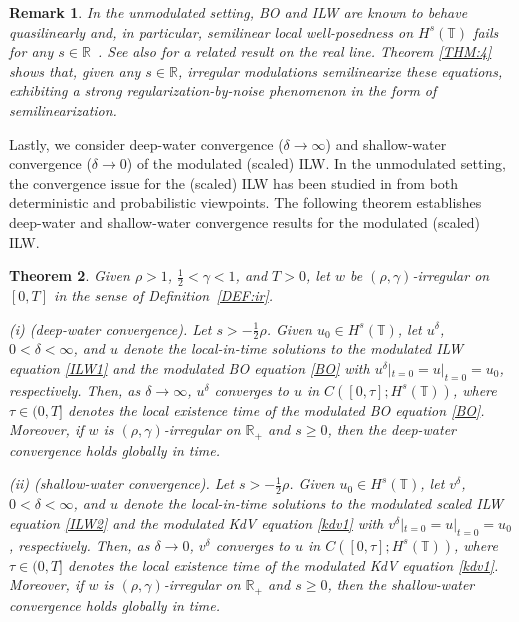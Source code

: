 \documentclass[letterpaper, 11pt,  reqno]{amsart}
\newtheorem{theorem}{Theorem} [section]
\newtheorem{remark}[theorem]{Remark}
\newcommand{\1}{\hspace{0.5mm}\text{I}\hspace{0.5mm}}
\newcommand{\noi}{\noindent}
\newcommand{\R}{\mathbb{R}}
\newcommand{\T}{\mathbb{T}}
\newcommand{\dl}{\delta}
\newcommand{\g}{\gamma}
\numberwithin{equation}{section}
\numberwithin{theorem}{section}
\begin{document}
\begin{remark}\label{REM:BO}\rm
In the unmodulated setting, 
BO and ILW
are known to behave 
quasilinearly
and,  in particular, 
semilinear local well-posedness
on $H^s(\T)$
fails for {\it any} $s \in \R$~\cite{MST, GKT24}.
See also \cite{KTz2} for a related result on the real line.
Theorem \ref{THM:4}
shows that, 
given any $s \in \R$, 
irregular modulations 
semilinearize  these equations, 
exhibiting 
a strong regularization-by-noise
phenomenon
 in the form of semilinearization. 




\end{remark}





Lastly, we consider deep-water convergence ($\dl \to \infty$)
and shallow-water convergence ($\dl \to 0$)
of the modulated (scaled) ILW.
In the unmodulated setting,  
the convergence  issue
 for the (scaled) ILW
 has been studied in 
 \cite{ABFS, Li24, LOZ,  CLOP,  FLZ, CLO}
from both deterministic and probabilistic viewpoints.
The following theorem establishes
deep-water 
and shallow-water convergence results
for the modulated (scaled) ILW.




\begin{theorem}
\label{THM:conv}
Given $\rho >   1$,  $\frac12< \g < 1$, and $T> 0$, 
let  $w$ be $(\rho,\g)$-irregular on $[0, T]$ in the sense of Definition~\ref{DEF:ir}.






\smallskip

\noi
\textup{(i) (deep-water convergence).}
Let 
$s > - \frac 12 \rho$.
Given $u_0 \in H^s (\T)$,
let $u^\dl$, $0<   \dl < \infty$,  and $u$ denote the local-in-time solutions
to the modulated ILW equation \eqref{ILW1}
and the modulated BO equation \eqref{BO}
with $u^\dl|_{t = 0} = u|_{t = 0} = u_0$, respectively.
Then, as $\dl \to \infty$, 
$u^\dl$ converges to $u$ in 
$C([0, \tau]; H^s(\T))$, 
where $\tau \in (0,  T]$ denotes the local existence time of the modulated BO equation
\eqref{BO}.
Moreover, if 
  $w$ is $(\rho,\g)$-irregular on $\R_+$ 
and 
 $s \ge 0 $, 
then the deep-water convergence holds globally in time.


\smallskip

\noi
\textup{(ii) (shallow-water convergence).}
Let 
$s > - \frac 12 \rho$.
Given $u_0 \in H^s (\T)$,
let $v^\dl$, $0<   \dl < \infty$,  and $u$ denote the local-in-time solutions
to the modulated scaled ILW equation \eqref{ILW2}
and the modulated KdV equation \eqref{kdv1}
with $v^\dl|_{t = 0} = u|_{t = 0} = u_0$, respectively.
Then, as $\dl \to 0$, 
$v^\dl$ converges to $u$ in 
$C([0, \tau]; H^s(\T))$, 
where $\tau \in (0, T]$ denotes the local existence time of the modulated KdV equation
\eqref{kdv1}.
Moreover, if 
  $w$ is $(\rho,\g)$-irregular on $\R_+$ 
and 
 $s \ge 0 $, 
then the shallow-water convergence holds globally in time.

\end{theorem}
\end{document}
